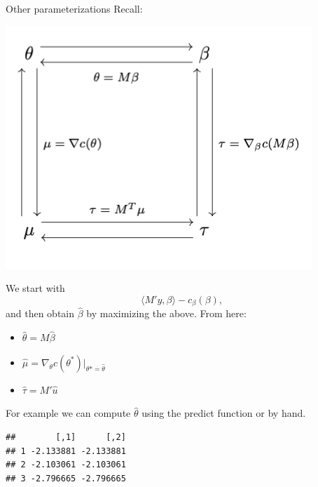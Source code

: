 \documentclass[
  ignorenonframetext,
]{beamer}
\newenvironment{Shaded}{\begin{snugshade}}{\end{snugshade}}
\newcommand{\AttributeTok}[1]{\textcolor[rgb]{0.77,0.63,0.00}{#1}}
\newcommand{\DecValTok}[1]{\textcolor[rgb]{0.00,0.00,0.81}{#1}}
\newcommand{\FunctionTok}[1]{\textcolor[rgb]{0.00,0.00,0.00}{#1}}
\newcommand{\NormalTok}[1]{#1}
\newcommand{\OtherTok}[1]{\textcolor[rgb]{0.56,0.35,0.01}{#1}}
\newcommand{\SpecialCharTok}[1]{\textcolor[rgb]{0.00,0.00,0.00}{#1}}
\newcommand{\StringTok}[1]{\textcolor[rgb]{0.31,0.60,0.02}{#1}}
\providecommand{\tightlist}{%
  \setlength{\itemsep}{0pt}\setlength{\parskip}{0pt}}
\begin{document}
\begin{frame}{Other parameterizations}
\protect\hypertarget{other-parameterizations}{}
Recall:

\includegraphics{transformations.png}
\end{frame}

\begin{frame}[fragile]{}
\protect\hypertarget{section-14}{}
We start with \[
  \langle M'y, \beta \rangle - c_\beta(\beta),
\] and then obtain \(\hat{\beta}\) by maximizing the above. From here:

\begin{itemize}
\tightlist
\item
  \(\hat{\theta} = M\hat{\beta}\)
\item
  \(\hat\mu = \nabla_\theta c(\theta^*)|_{\theta* = \hat{\theta}}\)
\item
  \(\hat\tau = M'\hat{u}\)
\end{itemize}

\vspace{12pt}

For example we can compute \(\hat\theta\) using the predict function or
by hand. \tiny

\begin{Shaded}
\end{Shaded}

\begin{verbatim}
##        [,1]      [,2]
## 1 -2.133881 -2.133881
## 2 -2.103061 -2.103061
## 3 -2.796665 -2.796665
\end{verbatim}
\end{frame}
\end{document}
